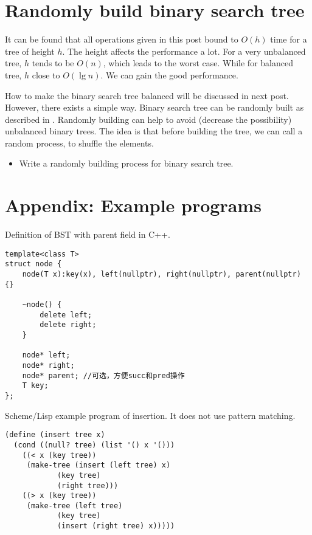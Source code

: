 \documentclass{article}
\begin{document}
\section{Randomly build binary search tree}
It can be found that all operations given in this post bound to $O(h)$
time for a tree of height $h$. The height affects the performance
a lot. For a very unbalanced tree, $h$ tends to be $O(n)$, which leads
to the worst case. While for balanced tree, $h$ close to $O(\lg n)$.
We can gain the good performance.

How to make the binary search tree
balanced will be discussed in next post. However, there exists a simple
way. Binary search tree can be randomly built as described in \cite{CLRS}.
Randomly building can help to avoid (decrease the possibility) unbalanced
binary trees. The idea is that before building the tree, we can call a random
process, to shuffle the elements.

\begin{Exercise}

\begin{itemize}
\item Write a randomly building process for binary search tree.
\end{itemize}

\end{Exercise}

\section{Appendix: Example programs}

Definition of BST with parent field in C++.

\lstset{language=C++, frame=single}
\begin{lstlisting}
template<class T>
struct node {
    node(T x):key(x), left(nullptr), right(nullptr), parent(nullptr) {}

    ~node() {
        delete left;
        delete right;
    }

    node* left;
    node* right;
    node* parent; //可选，方便succ和pred操作
    T key;
};
\end{lstlisting}

Scheme/Lisp example program of insertion. It does not use pattern matching.

\lstset{language=lisp}
\begin{lstlisting}
(define (insert tree x)
  (cond ((null? tree) (list '() x '()))
	((< x (key tree))
	 (make-tree (insert (left tree) x)
		    (key tree)
		    (right tree)))
	((> x (key tree))
	 (make-tree (left tree)
		    (key tree)
		    (insert (right tree) x)))))
\end{lstlisting}
\end{document}
